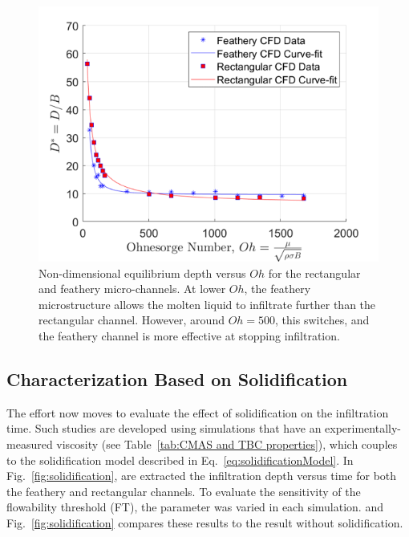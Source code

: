 \documentclass[%
 aip,
 amsmath,amssymb,
 reprint,%
]{revtex4-1}
\begin{document}
\begin{figure}[htp!]
    \centering
    \includegraphics[width=\linewidth]{Figures/Rect_feather_compare.png}
    \caption{Non-dimensional equilibrium depth versus $Oh$ for the rectangular and feathery micro-channels. At lower $Oh$, the feathery microstructure allows the molten liquid to infiltrate further than the rectangular channel. However, around $Oh = 500$, this switches, and the feathery channel is more effective at stopping infiltration.}
    \label{fig:rect_v_feather_oh}
\end{figure}

\subsection{Characterization Based on Solidification}
\label{sec:solidificationCharacterization}
The effort now moves to evaluate the effect of solidification on the infiltration time.
Such studies are developed using simulations that have an experimentally-measured viscosity (see Table~\ref{tab:CMAS and TBC properties}\cite{Naraparaju2017}), which couples to the solidification model described in Eq.~\ref{eq:solidificationModel}. In Fig.~\ref{fig:solidification}, are extracted the infiltration depth versus time for both the feathery and rectangular channels. 
To evaluate the sensitivity of the flowability threshold (FT), the parameter was varied in each simulation.  and Fig.~\ref{fig:solidification} compares these results to the result without solidification.
\end{document}

